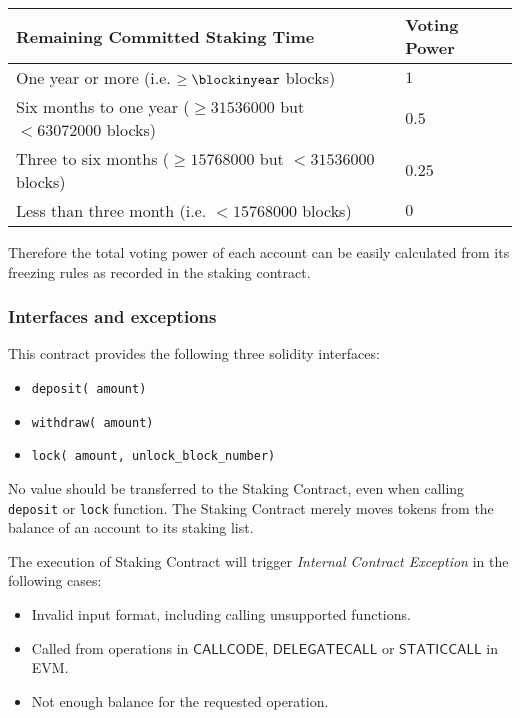 \par
\begin{center}
\begin{tabular}{ll}
\toprule
Remaining Committed Staking Time & Voting Power \\
\midrule
One year or more (i.e. $\ge \blockinyear$ blocks) & $1$  \\
Six months to one year ($\ge 31536000$ but $<63072000$ blocks) & $0.5$ \\
Three to six months ($\ge 15768000$ but $<31536000$ blocks) & $0.25$\\
Less than three month (i.e. $< 15768000$ blocks) & $0$ \\
\bottomrule
\end{tabular}
\end{center}
\par
Therefore the total voting power of each account can be easily calculated from its freezing rules as recorded in the staking contract.

\subsubsection{Interfaces and exceptions}

This contract provides the following three solidity interfaces:
\begin{itemize}[nosep]
	\item {\tt deposit( amount)}
    \item {\tt withdraw( amount)}
    \item {\tt lock( amount,  unlock\_block\_number)} 
\end{itemize}

No value should be transferred to the Staking Contract, 
even when calling {\tt deposit} or {\tt lock} function. 
The Staking Contract merely moves tokens from the balance of an account to its staking list. 

The execution of Staking Contract will trigger \emph{Internal Contract Exception} in the following cases:
\begin{itemize}[nosep]
	\item Invalid input format, including calling unsupported functions.

	\item Called from operations in $\mathsf{CALLCODE}$, $\mathsf{DELEGATECALL}$ or $\mathsf{STATICCALL}$ in EVM.

    \item Not enough balance for the requested operation.
\end{itemize}

